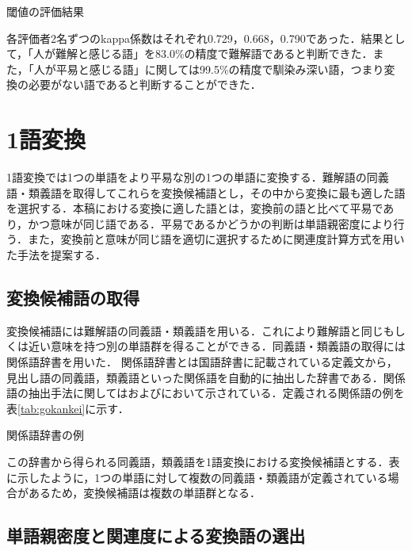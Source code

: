 \documentclass[japanese]{jnlp_1.4}
\begin{document}
\begin{table}[t]
\caption{閾値の評価結果}
\label{tab:ikitiHyouka}

\end{table}

各評価者2名ずつのkappa係数はそれぞれ0.729，0.668，0.790であった．結果として，「人が難解と感じる語」を83.0\%の精度で難解語であると判断できた．また，「人が平易と感じる語」に関しては99.5\%の精度で馴染み深い語，つまり変換の必要がない語であると判断することができた．



\section{1語変換}

1語変換では1つの単語をより平易な別の1つの単語に変換する．難解語の同義語・類義語を取得してこれらを変換候補語とし，その中から変換に最も適した語を選択する．本稿における変換に適した語とは，変換前の語と比べて平易であり，かつ意味が同じ語である．平易であるかどうかの判断は単語親密度により行う．また，変換前と意味が同じ語を適切に選択するために関連度計算方式を用いた手法を提案する．


\subsection{変換候補語の取得}

変換候補語には難解語の同義語・類義語を用いる．これにより難解語と同じもしくは近い意味を持つ別の単語群を得ることができる．同義語・類義語の取得には関係語辞書を用いた．
関係語辞書とは国語辞書に記載されている定義文から，見出し語の同義語，類義語といった関係語を自動的に抽出した辞書である．関係語の抽出手法に関しては\cite{Article_10}および\cite{Article_11}において示されている．定義される関係語の例を表\ref{tab:gokankei}に示す．

\begin{table}[b]
\vspace{-0.5\Cvs}
\caption{関係語辞書の例}
\label{tab:gokankei}

\end{table}

この辞書から得られる同義語，類義語を1語変換における変換候補語とする．表に示したように，1つの単語に対して複数の同義語・類義語が定義されている場合があるため，変換候補語は複数の単語群となる．


\subsection{単語親密度と関連度による変換語の選出}
\end{document}
